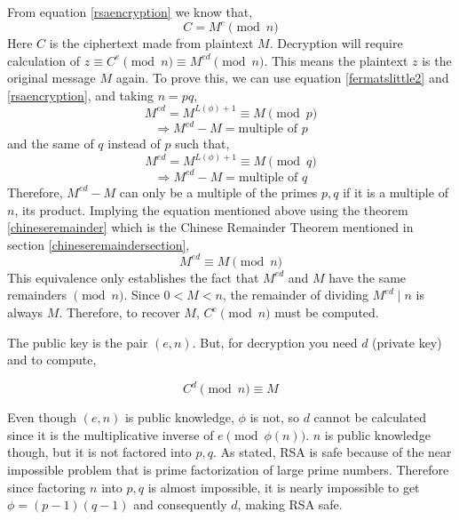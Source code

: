 \documentclass[a4paper,12pt]{article}
\theoremstyle{definition}
\begin{document}
From equation \ref{rsaencryption} we know that,
\begin{equation} 
	C = M^e\pmod n
\end{equation}
\indent Here $C$ is the ciphertext made from plaintext $M$. Decryption will require calculation of $z  \equiv C^e \pmod n \equiv M^{ed} \pmod n$. This means the plaintext $z$ is the original message $M$ again. To prove this, we can use equation \ref{fermatslittle2} and \ref{rsaencryption}, and taking $n=pq$,
\begin{equation}
	M^{ed} = M^{L(\phi) +1} \equiv M \pmod p
\end{equation}
\begin{equation}
	\Rightarrow M^{ed} - M = \mbox{multiple of }p
\end{equation}
and the same of $q$ instead of $p$ such that, 
\begin{equation}
		M^{ed} = M^{L(\phi) +1} \equiv M \pmod q
\end{equation}
\begin{equation}
	\Rightarrow M^{ed} - M = \mbox{multiple of }q
\end{equation}
\indent Therefore, $M^{ed} -M$ can only be a multiple of the primes $p,q$ if it is a multiple of $n$, its product. Implying the equation mentioned above using the theorem \ref{chineseremainder} which is the Chinese Remainder Theorem mentioned in section \ref{chineseremaindersection},
\begin{equation}
	M^{ed} \equiv M \pmod n
\end{equation}
\indent This equivalence only establishes the fact that $M^{ed}$ and $M$ have the same remainders $\pmod n$. Since $0<M<n$, the remainder of dividing $M^{ed} \mid n$ is always $M$. Therefore, to recover $M$, $C^e \pmod n$ must be computed.

The public key is the pair $(e,n)$. But, for decryption you need $d$ (private key) and to compute,

\begin{equation} \label{rsadecryption}
	C^d \pmod n \equiv M
\end{equation}

Even though $(e,n)$ is public knowledge, $\phi$ is not, so $d$ cannot be calculated since it is the multiplicative inverse of $e \pmod{\phi(n)}$. $n$ is public knowledge though, but it is not factored into $p,q$. As stated, RSA is safe because of the near impossible problem that is prime factorization of large prime numbers. Therefore since factoring $n$ into $p,q$ is almost impossible, it is nearly impossible to get $\phi = (p-1)(q-1)$ and consequently $d$, making RSA safe.
\end{document}
